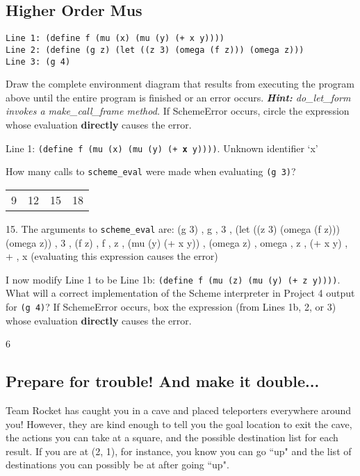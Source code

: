 \subsection*{Higher Order Mus}
\begin{questions}
\begin{lstlisting}
Line 1: (define f (mu (x) (mu (y) (+ x y))))
Line 2: (define (g z) (let ((z 3) (omega (f z))) (omega z)))
Line 3: (g 4)
\end{lstlisting}

\question Draw the complete environment diagram that results from executing the program above until the entire program is finished or an error occurs. \emph{\textbf{Hint:} do\_let\_form invokes a make\_call\_frame method.} If SchemeError occurs, circle the expression whose evaluation \textbf{directly} causes the error.
\begin{solution}[3in]
Line 1: {\tt (define f (mu (x) (mu (y) (+ \textbf{x} y))))}. Unknown identifier `x'
\end{solution}

\question How many calls to {\tt scheme\_eval} were made when evaluating {\tt (g 3)}? 
\newline
\begin{tabular} { l c c r }
9 & 12 & 15 & 18\\
\end{tabular}
\begin{solution}
15. The arguments to {\tt scheme\_eval} are:
(g 3)
, g
, 3
, (let ((z 3) (omega (f z))) (omega z))
, 3
, (f z)
, f
, z
, (mu (y) (+ x y))
, (omega z)
, omega
, z
, (+ x y)
, +
, x (evaluating this expression causes the error)
\end{solution}

\question I now modify Line 1 to be Line 1b: {\tt (define f (mu (z) (mu (y) (+ z y))))}. What will a correct implementation of the Scheme interpreter in Project 4 output for {\tt (g 4)}? If SchemeError occurs, box the expression (from Lines 1b, 2, or 3) whose evaluation \textbf{directly} causes the error.
\begin{solution}
6
\end{solution}

\end{questions}



\subsection*{Prepare for trouble! And make it double...}
Team Rocket has caught you in a cave and placed teleporters everywhere around you! However, they are kind enough to tell you the goal location to exit the cave, the actions you can take at a square, and the possible destination list for each result. If you are at (2, 1), for instance, you know you can go ``up" and the list of destinations you can possibly be at after going ``up".

